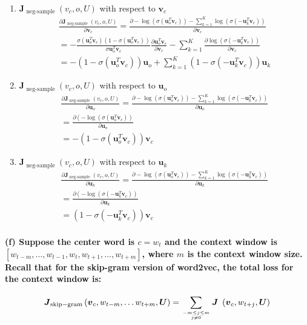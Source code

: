 \documentclass[12pt, letterpaper]{article}
\newcommand{\uxvc}[1]{\boldsymbol{u}_{#1}^{T} \boldsymbol{v}_{c}}
\newcommand{\Jnegsampling}{\boldsymbol{J}_{\text { neg-sample }}\left(v_{c}, o, U\right)} %
\newcommand{\negsamploss}{-\log \left(\sigma\left(\boldsymbol{u}_{o}^{T} \boldsymbol{v}_{c}\right)\right)-\sum_{k=1}^{K} \log \left(\sigma\left(-\boldsymbol{u}_{k}^{T} \boldsymbol{v}_{c}\right)\right)}
\newcommand{\Jskipgram}{\boldsymbol{J}_{\mathrm{skip-gram}}\left(\boldsymbol{v}_{c}, w_{t-m}, \ldots w_{t+m}, \boldsymbol{U}\right)} %
\newcommand{\singleskipgram}[1]{\boldsymbol{J}_{\text{#1}}\left(\boldsymbol{v}_{c}, w_{t+j}, \boldsymbol{U}\right)}
\newcommand{\sigmoidD}[1]{\sigma(#1)(1 - \sigma(#1))}
\newcommand{\partialD}[2]{\frac{\partial #1}{\partial #2}}
\begin{document}
\begin{enumerate}
    \item $\Jnegsampling$ with respect to $\boldsymbol{v}_c$ {
        \begin{align*}
            \partialD{\Jnegsampling}{\boldsymbol{v}_c} = \partialD{\negsamploss}{\boldsymbol{v}_c} \\
            = -\frac{\sigmoidD{\uxvc{o}}}{\sigma{\uxvc{o}}} \partialD{\uxvc{o}}{\boldsymbol{v}_c} - \sum_{k=1}^{K} \partialD{\log \left(\sigma\left(-\boldsymbol{u}_{k}^{T} \boldsymbol{v}_{c}\right)\right)}{\boldsymbol{v}_c} \\
            = -\left(1-\sigma\left(\boldsymbol{u}_{o}^{T} \boldsymbol{v}_{c}\right)\right) \boldsymbol{u}_{o}+\sum_{k=1}^{K}\left(1-\sigma\left(-\boldsymbol{u}_{k}^{T} \boldsymbol{v}_{c}\right)\right) \boldsymbol{u}_{k}
        \end{align*}
    }
    \item $\Jnegsampling$ with respect to $\boldsymbol{u}_o$ {
        \begin{align*}
            \partialD{\Jnegsampling}{\boldsymbol{u}_o} = \partialD{\negsamploss}{\boldsymbol{u}_o} \\
            = \partialD{\left(-\log \left(\sigma\left(\boldsymbol{u}_{o}^{T} \boldsymbol{v}_{c}\right)\right)\right.}{\boldsymbol{u}_{o}} \\
            = -\left(1-\sigma\left(\boldsymbol{u}_{o}^{T} \boldsymbol{v}_{c}\right)\right) \boldsymbol{v}_{c}
        \end{align*}
    }
    \item $\Jnegsampling$ with respect to $\boldsymbol{u}_k$ {
        \begin{align*}
            \partialD{\Jnegsampling}{\boldsymbol{u}_k} = \partialD{\negsamploss}{\boldsymbol{u}_k} \\
            = \partialD{\left(-\log \left(\sigma\left(-\boldsymbol{u}_{k}^{T} \boldsymbol{v}_{c}\right)\right)\right.}{\boldsymbol{u}_{k}} \\
            = \left(1-\sigma\left(-\boldsymbol{u}_{k}^{T} \boldsymbol{v}_{c}\right)\right) \boldsymbol{v}_{c}
        \end{align*}
    }
\end{enumerate}


\paragraph{(f) Suppose the center word is $c = w_t$ and the context window is $[w_{t−m}, \dots, w_{t−1}, w_t, w_{t+1}, \dots, w_{t+m}]$, where $m$ is the context window size. Recall that for the skip-gram version of word2vec, the total loss for the context window is:}
\begin{equation}
    \Jskipgram = \sum_{-m \leq j \leq m \atop j \neq 0} \singleskipgram{~}
\end{equation}
\end{document}
